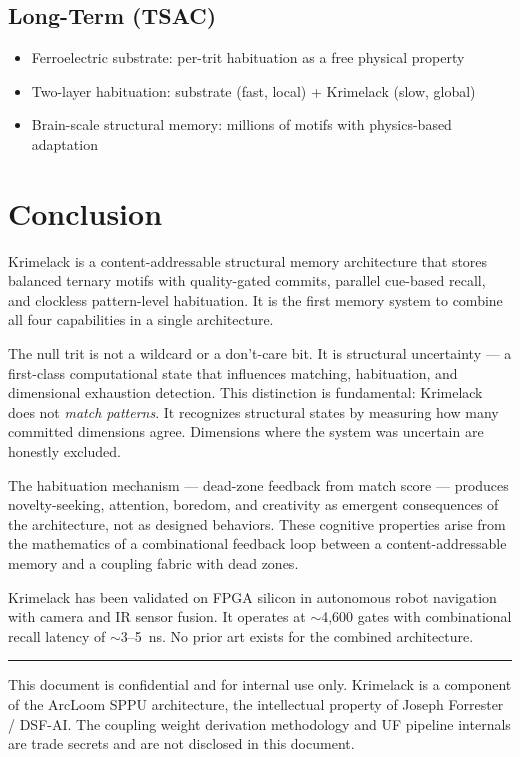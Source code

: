 \documentclass[11pt, a4paper]{article}
\begin{document}
\subsection{Long-Term (TSAC)}

\begin{itemize}[nosep]
  \item Ferroelectric substrate: per-trit habituation as a free
        physical property
  \item Two-layer habituation: substrate (fast, local) + Krimelack
        (slow, global)
  \item Brain-scale structural memory: millions of motifs with
        physics-based adaptation
\end{itemize}

\section{Conclusion}

Krimelack is a content-addressable structural memory architecture
that stores balanced ternary motifs with quality-gated commits,
parallel cue-based recall, and clockless pattern-level habituation.
It is the first memory system to combine all four capabilities in
a single architecture.

The null trit is not a wildcard or a don't-care bit. It is
structural uncertainty --- a first-class computational state that
influences matching, habituation, and dimensional exhaustion
detection. This distinction is fundamental: Krimelack does not
\textit{match patterns}. It recognizes structural states by
measuring how many committed dimensions agree. Dimensions where
the system was uncertain are honestly excluded.

The habituation mechanism --- dead-zone feedback from match
score --- produces novelty-seeking, attention, boredom, and
creativity as emergent consequences of the architecture, not as
designed behaviors. These cognitive properties arise from the
mathematics of a combinational feedback loop between a
content-addressable memory and a coupling fabric with dead zones.

Krimelack has been validated on FPGA silicon in autonomous robot
navigation with camera and IR sensor fusion. It operates at
$\sim$4,600 gates with combinational recall latency of
$\sim$3--5~ns. No prior art exists for the combined architecture.

\vspace{2em}
\hrule
\vspace{0.5em}
{\color{nm-gray}\small This document is confidential and for
internal use only. Krimelack is a component of the ArcLoom SPPU
architecture, the intellectual property of Joseph Forrester /
DSF-AI. The coupling weight derivation methodology and UF pipeline
internals are trade secrets and are not disclosed in this document.}
\end{document}
